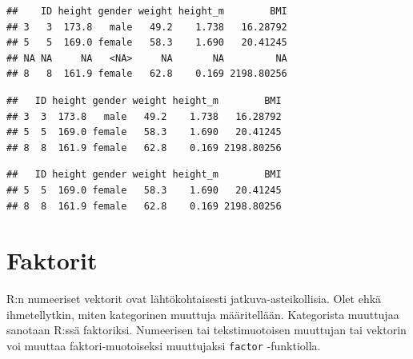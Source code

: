 \documentclass[
]{book}
\newenvironment{Shaded}{\begin{snugshade}}{\end{snugshade}}
\newcommand{\CommentTok}[1]{\textcolor[rgb]{0.56,0.35,0.01}{\textit{#1}}}
\newcommand{\DecValTok}[1]{\textcolor[rgb]{0.00,0.00,0.81}{#1}}
\newcommand{\FunctionTok}[1]{\textcolor[rgb]{0.00,0.00,0.00}{#1}}
\newcommand{\NormalTok}[1]{#1}
\newcommand{\SpecialCharTok}[1]{\textcolor[rgb]{0.00,0.00,0.00}{#1}}
\newcommand{\StringTok}[1]{\textcolor[rgb]{0.31,0.60,0.02}{#1}}
\begin{document}
\begin{verbatim}
##    ID height gender weight height_m        BMI
## 3   3  173.8   male   49.2    1.738   16.28792
## 5   5  169.0 female   58.3    1.690   20.41245
## NA NA     NA   <NA>     NA       NA         NA
## 8   8  161.9 female   62.8    0.169 2198.80256
\end{verbatim}

\begin{Shaded}
\end{Shaded}

\begin{verbatim}
##   ID height gender weight height_m        BMI
## 3  3  173.8   male   49.2    1.738   16.28792
## 5  5  169.0 female   58.3    1.690   20.41245
## 8  8  161.9 female   62.8    0.169 2198.80256
\end{verbatim}

\begin{Shaded}
\end{Shaded}

\begin{verbatim}
##   ID height gender weight height_m        BMI
## 5  5  169.0 female   58.3    1.690   20.41245
## 8  8  161.9 female   62.8    0.169 2198.80256
\end{verbatim}

\hypertarget{faktorit}{%
\section{Faktorit}\label{faktorit}}

R:n numeeriset vektorit ovat lähtökohtaisesti jatkuva-asteikollisia. Olet ehkä ihmetellytkin, miten kategorinen muuttuja määritellään. Kategorista muuttujaa sanotaan R:ssä faktoriksi. Numeerisen tai tekstimuotoisen muuttujan tai vektorin voi muuttaa faktori-muotoiseksi muuttujaksi \texttt{factor} -funktiolla.
\end{document}
